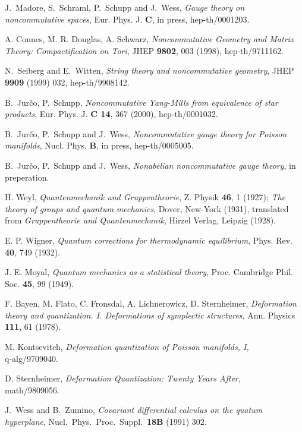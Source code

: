 \documentclass[a4paper,11pt]{article}
\providecommand*\ti[5]{{\em #5}, {#1} {\bf #2}, #3 (#4)}
\providecommand*\jhep{JHEP}
\providecommand*\pr{Phys. Rev.}
\begin{document}
\begin{thebibliography}{99}

J.~Madore, S.~Schraml, P.~Schupp and J.~Wess,
{\it Gauge theory on noncommutative spaces},
Eur. Phys. J. {\bf C}, in press,
hep-th/0001203.

 A. Connes, M. R. Douglas, A. Schwarz,
\ti{\jhep}{9802}{003}{1998}{Noncommutative Geometry and Matrix Theory:
Compactification on Tori}, hep-th/9711162.

N.~Seiberg and E.~Witten,
{\it String theory and noncommutative geometry},
JHEP {\bf 9909} (1999) 032,
hep-th/9908142.

B.~Jur\v co, P.~Schupp,
{\it Noncommutative Yang-Mills from equivalence of star products},
Eur. Phys. J. {\bf C 14}, 367 (2000), hep-th/0001032.

B.~Jur\v co, P.~Schupp and J.~Wess,
{\it Noncommutative gauge theory for Poisson manifolds},
Nucl. Phys. {\bf B}, in press,
hep-th/0005005.

B.~Jur\v co, P.~Schupp and J.~Wess,
{\it Nonabelian noncommutative gauge theory},
in preperation.

H. Weyl, \ti{Z. Physik}{46}{1}{1927}{Quantenmechanik
und Gruppentheorie}; {\em The theory of groups and quantum
mechanics}, Dover, New-York (1931), translated from {\em
Gruppentheorie und Quantenmechanik}, Hirzel Verlag, Leipzig (1928).

E. P. Wigner, \ti{\pr}{40}{749}{1932}{Quantum
corrections for thermodynamic equilibrium}.

J. E. Moyal, \ti{Proc. Cambridge Phil.
Soc.}{45}{99}{1949}{Quantum mechanics as a statistical theory}.

 F. Bayen, M. Flato, C. Fronsdal, A. Lichnerowicz, D.
Sternheimer, \ti{Ann. Physics}{111}{61}{1978}{Deformation theory and
quantization. I. Deformations of symplectic structures}.

 M. Kontsevitch, \emph{Deformation quantization of Poisson
manifolds, I,}\\q-alg/9709040.

 D. Sternheimer, \emph{Deformation Quantization: Twenty
Years After}, \\math/9809056.

J.~Wess and B.~Zumino,
{\it Covariant differential calculus on the quatum hyperplane}, 
Nucl.\ Phys.\ Proc.\ Suppl.\  {\bf 18B} (1991) 302.



\end{thebibliography}
\end{document}
